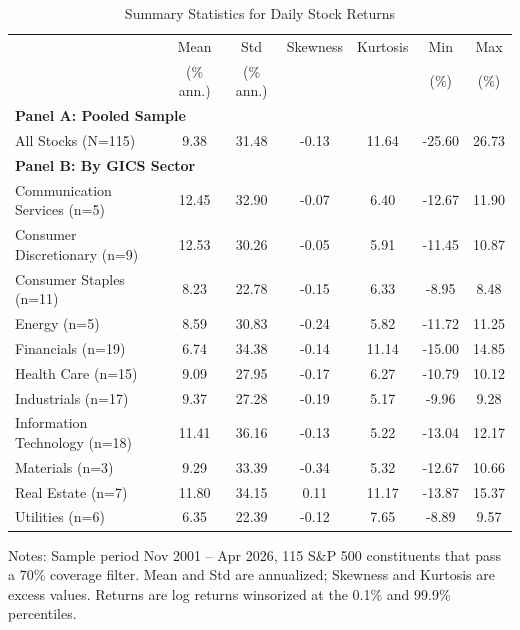
\begin{table}[htbp]
\centering
\caption{Summary Statistics for Daily Stock Returns}
\label{tab:summary_stats}
\small
\begin{tabular}{lcccccc}
\toprule
 & Mean & Std & Skewness & Kurtosis & Min & Max \\
 & (\% ann.) & (\% ann.) & & & (\%) & (\%) \\
\midrule
\multicolumn{7}{l}{\textbf{Panel A: Pooled Sample}} \\
All Stocks (N=115) & 9.38 & 31.48 & -0.13 & 11.64 & -25.60 & 26.73 \\
\midrule
\multicolumn{7}{l}{\textbf{Panel B: By GICS Sector}} \\
Communication Services (n=5) & 12.45 & 32.90 & -0.07 & 6.40 & -12.67 & 11.90 \\
Consumer Discretionary (n=9) & 12.53 & 30.26 & -0.05 & 5.91 & -11.45 & 10.87 \\
Consumer Staples (n=11) & 8.23 & 22.78 & -0.15 & 6.33 & -8.95 & 8.48 \\
Energy (n=5) & 8.59 & 30.83 & -0.24 & 5.82 & -11.72 & 11.25 \\
Financials (n=19) & 6.74 & 34.38 & -0.14 & 11.14 & -15.00 & 14.85 \\
Health Care (n=15) & 9.09 & 27.95 & -0.17 & 6.27 & -10.79 & 10.12 \\
Industrials (n=17) & 9.37 & 27.28 & -0.19 & 5.17 & -9.96 & 9.28 \\
Information Technology (n=18) & 11.41 & 36.16 & -0.13 & 5.22 & -13.04 & 12.17 \\
Materials (n=3) & 9.29 & 33.39 & -0.34 & 5.32 & -12.67 & 10.66 \\
Real Estate (n=7) & 11.80 & 34.15 & 0.11 & 11.17 & -13.87 & 15.37 \\
Utilities (n=6) & 6.35 & 22.39 & -0.12 & 7.65 & -8.89 & 9.57 \\
\bottomrule
\end{tabular}
\begin{tablenotes}\small
\item Notes: Sample period Nov 2001 -- Apr 2026, 115 S\&P 500 constituents that pass a 70\% coverage filter. Mean and Std are annualized; Skewness and Kurtosis are excess values. Returns are log returns winsorized at the 0.1\% and 99.9\% percentiles.
\end{tablenotes}
\end{table}